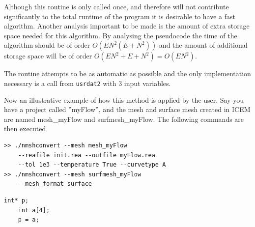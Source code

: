 Although this routine is only called once, and therefore will not contribute significantly 
to the total runtime of the program it is desirable to have a fast algorithm. Another analysis
important to be made is the amount of extra storage space needed for this algorithm.
By analysing the pseudocode the time of the algorithm should be of order $O(EN^2(E+N^2))$
and the amount of additional storage space will be of order $O(EN^2+E+N^2)=O(EN^2)$.

The routine attempts to be as automatic as possible and the only implementation necessary is 
a call from \verb|usrdat2| with 3 input variables.

Now an illustrative example of how this method is applied by the user. Say you have a project
called ''myFlow'', and the mesh and surface mesh created in ICEM are named mesh\_myFlow and 
surfmesh\_myFlow. The following commands are then executed

%

% 
\begin{verbatim}
>> ./nmshconvert --mesh mesh_myFlow 
    --reafile init.rea --outfile myFlow.rea
    --tol 1e3 --temperature True --curvetype A
>> ./nmshconvert --mesh surfmesh_myFlow 
    --mesh_format surface

\end{verbatim}
% 
\begin{lstlisting}[style=FormattedNumber, frame=none]
    int* p;
    int a[4];
    p = a;
\end{lstlisting}
